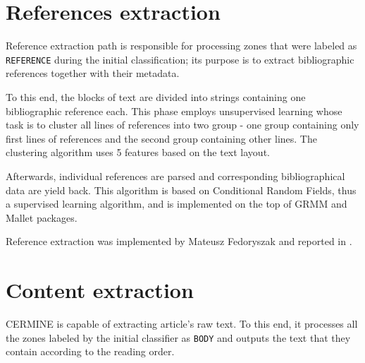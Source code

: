 \section{References extraction}
Reference extraction path is responsible for processing zones that were labeled as \verb+REFERENCE+ during the initial classification; its purpose is to extract bibliographic references together with their metadata.

To this end, the blocks of text are divided into strings containing one bibliographic reference each. This phase employs unsupervised learning whose task is to cluster all lines of references into two group - one group containing only first lines of references and the second group containing other lines. The clustering algorithm uses 5 features based on the text layout.

Afterwards, individual references are parsed and corresponding bibliographical data are yield back. This algorithm is based on Conditional Random Fields, thus a supervised learning algorithm, and is implemented on the top of GRMM and Mallet packages.

Reference extraction was implemented by Mateusz Fedoryszak and reported in \cite{DominikaTkaczykPaweSzostekMateuszFedoryszakPiotrJanDendek2014}.
\section{Content extraction}
CERMINE is capable of extracting article's raw text. To this end, it processes all the zones labeled by the initial classifier as \verb+BODY+ and outputs the text that they contain according to the reading order. 


